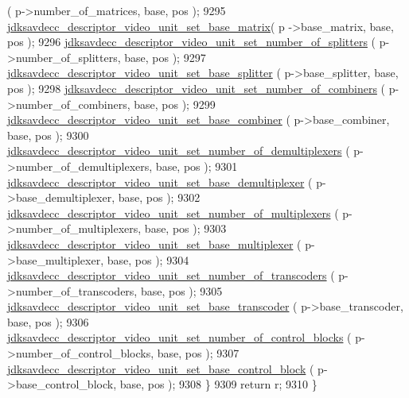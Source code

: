 \begin{DoxyCode}
      ( p->number\_of\_matrices, base, pos );
9295         \hyperlink{group__descriptor__video_ga6e6f153070bf0ded0b81097b52f00d59}{jdksavdecc\_descriptor\_video\_unit\_set\_base\_matrix}( p
      ->base\_matrix, base, pos );
9296         \hyperlink{group__descriptor__video_ga1021559f71d3e0165c7f6e0fdf01583e}{jdksavdecc\_descriptor\_video\_unit\_set\_number\_of\_splitters}
      ( p->number\_of\_splitters, base, pos );
9297         \hyperlink{group__descriptor__video_ga7450dc8fa3493bda4f4971207e34d7d1}{jdksavdecc\_descriptor\_video\_unit\_set\_base\_splitter}
      ( p->base\_splitter, base, pos );
9298         \hyperlink{group__descriptor__video_gad5271eb04245fbddabd1cac8d50f2743}{jdksavdecc\_descriptor\_video\_unit\_set\_number\_of\_combiners}
      ( p->number\_of\_combiners, base, pos );
9299         \hyperlink{group__descriptor__video_ga4dd99a1998a2c562421ee8c5ccf794f1}{jdksavdecc\_descriptor\_video\_unit\_set\_base\_combiner}
      ( p->base\_combiner, base, pos );
9300         \hyperlink{group__descriptor__video_ga28d4621e64f6fa0213b8e5be4db57510}{jdksavdecc\_descriptor\_video\_unit\_set\_number\_of\_demultiplexers}
      ( p->number\_of\_demultiplexers, base, pos );
9301         \hyperlink{group__descriptor__video_gacda33f0a85ac56466553789cb7180760}{jdksavdecc\_descriptor\_video\_unit\_set\_base\_demultiplexer}
      ( p->base\_demultiplexer, base, pos );
9302         \hyperlink{group__descriptor__video_ga977605b0f0b32e7295171790fe162347}{jdksavdecc\_descriptor\_video\_unit\_set\_number\_of\_multiplexers}
      ( p->number\_of\_multiplexers, base, pos );
9303         \hyperlink{group__descriptor__video_ga6b5242166bd8f62aa1aeaa602ec6b7f5}{jdksavdecc\_descriptor\_video\_unit\_set\_base\_multiplexer}
      ( p->base\_multiplexer, base, pos );
9304         \hyperlink{group__descriptor__video_gadd12e6a0e8f16eb286b594c4018a3b0e}{jdksavdecc\_descriptor\_video\_unit\_set\_number\_of\_transcoders}
      ( p->number\_of\_transcoders, base, pos );
9305         \hyperlink{group__descriptor__video_ga01723db1c4b8e1abb01f48c5576bf447}{jdksavdecc\_descriptor\_video\_unit\_set\_base\_transcoder}
      ( p->base\_transcoder, base, pos );
9306         \hyperlink{group__descriptor__video_gaeb8d7f56a16eadfe0f3b4137abbd0d7b}{jdksavdecc\_descriptor\_video\_unit\_set\_number\_of\_control\_blocks}
      ( p->number\_of\_control\_blocks, base, pos );
9307         \hyperlink{group__descriptor__video_gab7f7944904ec168753aca5319c3c9dcb}{jdksavdecc\_descriptor\_video\_unit\_set\_base\_control\_block}
      ( p->base\_control\_block, base, pos );
9308     \}
9309     \textcolor{keywordflow}{return} r;
9310 \}
\end{DoxyCode}


